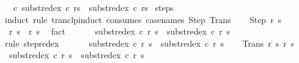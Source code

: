\begin{isabellebody}
\ \ \ {\isachardoublequoteopen}{\isasymAnd}c{\isachardot}\ {\isasymGamma}{\isasymturnstile}{\isacharparenleft}subst{\isacharunderscore}redex\ c\ r{\isacharcomma}s{\isacharparenright}\ {\isasymrightarrow}\isactrlsup {\isacharplus}\ {\isacharparenleft}subst{\isacharunderscore}redex\ c\ r{\isacharprime}{\isacharcomma}s{\isacharprime}{\isacharparenright}{\isachardoublequoteclose}\isanewline
%
\isadelimproof
%
\endisadelimproof
%
\isatagproof
{}\isamarkupfalse%
\ steps\isanewline
{}\isamarkupfalse%
\ {\isacharparenleft}induct\ rule{\isacharcolon}\ tranclp{\isacharunderscore}induct{}\ {\isacharbrackleft}consumes\ {}{\isacharcomma}case{\isacharunderscore}names\ Step\ Trans{\isacharbrackright}{\isacharparenright}\isanewline
\ \ \isamarkupfalse%
\ {\isacharparenleft}Step\ r{\isacharprime}\ s{\isacharprime}{\isacharparenright}\isanewline
\ \ \isamarkupfalse%
\ {\isachardoublequoteopen}{\isasymGamma}{\isasymturnstile}\ {\isacharparenleft}r{\isacharcomma}\ s{\isacharparenright}\ {\isasymrightarrow}\ {\isacharparenleft}r{\isacharprime}{\isacharcomma}\ s{\isacharprime}{\isacharparenright}{\isachardoublequoteclose}\ \isamarkupfalse%
\ fact\isanewline
\ \ \isamarkupfalse%
\ \isamarkupfalse%
\ {\isachardoublequoteopen}{\isasymGamma}{\isasymturnstile}\ {\isacharparenleft}subst{\isacharunderscore}redex\ c\ r{\isacharcomma}\ s{\isacharparenright}\ {\isasymrightarrow}\ {\isacharparenleft}subst{\isacharunderscore}redex\ c\ r{\isacharprime}{\isacharcomma}\ s{\isacharprime}{\isacharparenright}{\isachardoublequoteclose}\isanewline
\ \ \ \ \isamarkupfalse%
\ {\isacharparenleft}rule\ step{\isacharunderscore}redex{\isacharparenright}\isanewline
\ \ \isamarkupfalse%
\ \isamarkupfalse%
\ {\isachardoublequoteopen}{\isasymGamma}{\isasymturnstile}\ {\isacharparenleft}subst{\isacharunderscore}redex\ c\ r{\isacharcomma}\ s{\isacharparenright}\ {\isasymrightarrow}\isactrlsup {\isacharplus}\ {\isacharparenleft}subst{\isacharunderscore}redex\ c\ r{\isacharprime}{\isacharcomma}\ s{\isacharprime}{\isacharparenright}{\isachardoublequoteclose}\isacommand{{\isachardot}{\isachardot}}\isamarkupfalse%
\isanewline
{}\isamarkupfalse%
\isanewline
\ \ \isamarkupfalse%
\ {\isacharparenleft}Trans\ r{\isacharprime}\ s{\isacharprime}\ r{\isacharprime}{\isacharprime}\ s{\isacharprime}{\isacharprime}{\isacharparenright}\isanewline
\ \ \isamarkupfalse%
\ {\isachardoublequoteopen}{\isasymGamma}{\isasymturnstile}\ {\isacharparenleft}subst{\isacharunderscore}redex\ c\ r{\isacharcomma}\ s{\isacharparenright}\ {\isasymrightarrow}\isactrlsup {\isacharplus}\ {\isacharparenleft}subst{\isacharunderscore}redex\ c\ r{\isacharprime}{\isacharcomma}\ s{\isacharprime}{\isacharparenright}{\isachardoublequoteclose}\ \isamarkupfalse%

\end{isabellebody}
